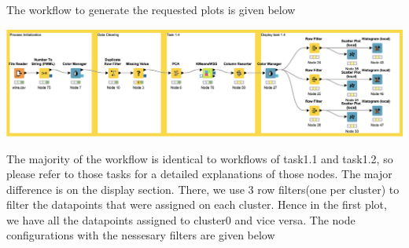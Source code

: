 \documentclass[11pt]{article}
\begin{document}
			
			The workflow to generate the requested plots is given below
			\iftrue
			\begin{center}
				\includegraphics[scale=0.25]{res/t1/t14/t14-workflow}
			\end{center}
			\fi
			The majority of the workflow is identical to workflows of task1.1 and task1.2, so please refer to those tasks for a detailed explanations of those nodes. The major difference is on the display section. There, we use 3 row filters(one per cluster) to filter the datapoints that were assigned on each cluster. Hence in the first plot, we have all the datapoints assigned to cluster0 and vice versa. The node configurations with the nessesary filters are given below
			\iftrue
\end{document}
